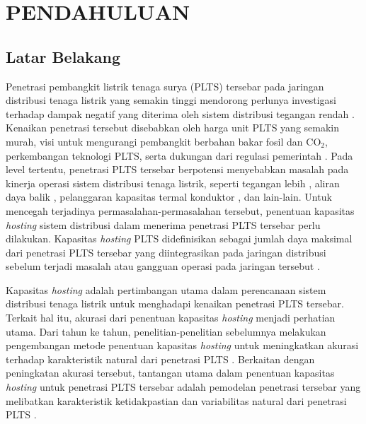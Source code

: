 \chapter{PENDAHULUAN}

\section{Latar Belakang}
Penetrasi pembangkit listrik tenaga surya (PLTS) tersebar pada jaringan distribusi tenaga listrik yang semakin tinggi \cite{IEApvps2020,irena2020} mendorong perlunya investigasi terhadap dampak negatif yang diterima oleh sistem distribusi tegangan rendah \cite{Hasheminamin2015,Reno2016,Olivier2016,Santos-Martin2016,Elrayyah2017,Mortazavi2015,Andresen2016}. Kenaikan penetrasi tersebut disebabkan oleh harga unit PLTS yang semakin murah, visi untuk mengurangi pembangkit berbahan bakar fosil dan CO$_2$, perkembangan teknologi PLTS, serta dukungan dari regulasi pemerintah \cite{Abreu2019,Comello2018,Karakaya2015,Handayani2019}. Pada level tertentu, penetrasi PLTS tersebar berpotensi menyebabkan masalah pada kinerja operasi sistem distribusi tenaga listrik, seperti tegangan lebih \cite{Hasheminamin2015,Reno2016,Olivier2016,Santos-Martin2016,Elrayyah2017}, aliran daya balik \cite{Mortazavi2015,Hasheminamin2015}, pelanggaran kapasitas termal konduktor \cite{Reno2016,Andresen2016}, dan lain-lain. Untuk mencegah terjadinya permasalahan-permasalahan tersebut, penentuan kapasitas \textit{hosting} sistem distribusi dalam menerima penetrasi PLTS tersebar perlu dilakukan. Kapasitas \textit{hosting} PLTS didefinisikan sebagai jumlah daya maksimal dari penetrasi PLTS tersebar yang diintegrasikan pada jaringan distribusi sebelum terjadi masalah atau gangguan operasi pada jaringan tersebut \cite{Bollen2011}. 

Kapasitas \textit{hosting} adalah pertimbangan utama dalam perencanaan sistem distribusi tenaga listrik untuk menghadapi kenaikan penetrasi PLTS tersebar\cite{Dubey2017,Epri2012}. Terkait hal itu, akurasi dari penentuan kapasitas \textit{hosting} menjadi perhatian utama. Dari tahun ke tahun, penelitian-penelitian sebelumnya melakukan pengembangan metode penentuan kapasitas \textit{hosting} untuk meningkatkan akurasi terhadap karakteristik natural dari penetrasi PLTS \cite{Breker2015,Kolenc2015,Bollen2017,Dubey2017,Epri2012}. Berkaitan dengan peningkatan akurasi tersebut, tantangan utama dalam penentuan kapasitas \textit{hosting} untuk penetrasi PLTS tersebar adalah pemodelan penetrasi tersebar yang melibatkan karakteristik ketidakpastian dan variabilitas natural dari penetrasi PLTS \cite{Heslop2016,Luthander2017,Emmanuel2017,Breker2015,Kolenc2015,Bollen2017,Dubey2017,Epri2012}.

